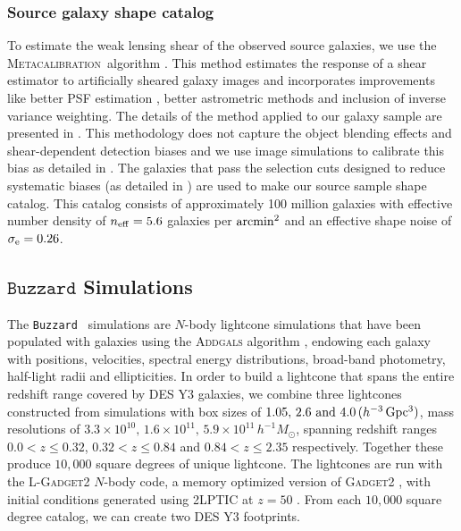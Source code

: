 \documentclass[aps, prd,twocolumn,superscriptaddress,nofootinbib,preprintnumbers]{revtex4-1}
\newcommand{\buzzard}{\texttt{Buzzard} }
\newcommand{\metacal}{{\textsc{Metacalibration}~}}
\begin{document}
\subsubsection{Source galaxy shape catalog}

To estimate the weak lensing shear of the observed source galaxies, we use the \metacal algorithm \citep{Sheldon_2017, huff2017metacalibration}. This method estimates the response of a shear estimator to artificially sheared galaxy images and incorporates improvements like better PSF estimation \citep{y3-piff}, better astrometric methods \citep{y3-gold} and inclusion of inverse variance weighting. The details of the method applied to our galaxy sample are presented in \cite{y3-shapecatalog}. This methodology does not capture the object blending effects and shear-dependent detection biases and we use image simulations to calibrate this bias as detailed in \citet{y3-imagesims}. The galaxies that pass the selection cuts designed to reduce systematic biases (as detailed in \citet*{y3-shapecatalog}) are used to make our source sample shape catalog. This catalog consists of approximately 100 million galaxies with effective number density of $n_{\rm eff} = 5.6$ galaxies per ${\rm arcmin}^2$ and an effective shape noise of $\sigma_{\rm e} = 0.26$.



\subsection{$\buzzard$ Simulations}

The \buzzard\ simulations are $N$-body lightcone simulations that have been populated with galaxies using the \textsc{Addgals} algorithm \citep{Addgals}, endowing each galaxy with positions, velocities, spectral energy distributions, broad-band photometry, half-light radii and ellipticities. In order to build a lightcone that spans the entire redshift range covered by DES Y3 galaxies, we combine three lightcones constructed from simulations with box sizes of $1.05,\, 2.6 \textrm{ and } 4.0\, (h^{-3}\, \rm Gpc^3)$, mass resolutions of $3.3\times10^{10},\, 1.6\times10^{11},\, 5.9\times10^{11}\, h^{-1}M_{\odot}$, spanning redshift ranges $0.0< z \leq 0.32$, $0.32< z \leq 0.84$ and $0.84< z \leq 2.35$ respectively. Together these produce $10,000$ square degrees of unique lightcone. The lightcones are run with the \textsc{L-Gadget2} $N$-body code, a memory optimized version of \textsc{Gadget2} \citep{Springel_2005}, with initial conditions generated using \textsc{2LPTIC} at $z=50$ \citep{Crocce2012}. From each $10,000$ square degree catalog, we can create two DES Y3 footprints.
\end{document}
